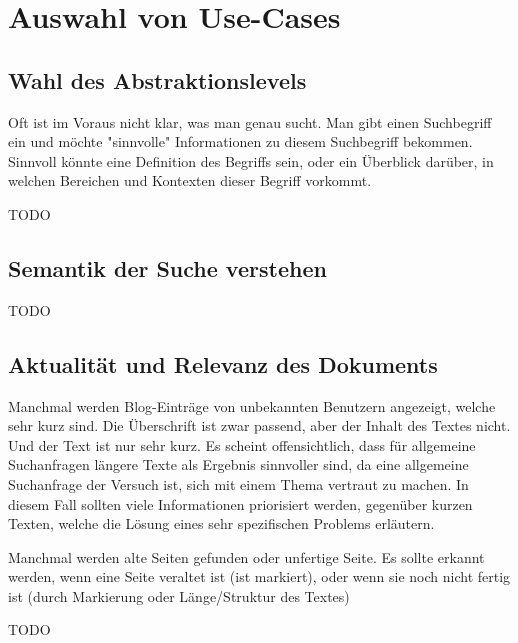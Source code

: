 \chapter{Auswahl von Use-Cases}

\section{Wahl des Abstraktionslevels}
Oft ist im Voraus nicht klar, was man genau sucht. Man gibt einen Suchbegriff ein und möchte "sinnvolle" Informationen zu diesem Suchbegriff bekommen. Sinnvoll könnte eine Definition des Begriffs sein, oder ein Überblick darüber, in welchen Bereichen und Kontexten dieser Begriff vorkommt.

TODO

\section{Semantik der Suche verstehen}
TODO

\section{Aktualität und Relevanz des Dokuments}
Manchmal werden Blog-Einträge von unbekannten Benutzern angezeigt, welche sehr kurz sind. Die Überschrift ist zwar passend, aber der Inhalt des Textes nicht. Und der Text ist nur sehr kurz. Es scheint offensichtlich, dass für allgemeine Suchanfragen längere Texte als Ergebnis sinnvoller sind, da eine allgemeine Suchanfrage der Versuch ist, sich mit einem Thema vertraut zu machen. In diesem Fall sollten viele Informationen priorisiert werden, gegenüber kurzen Texten, welche die Lösung eines sehr spezifischen Problems erläutern.

Manchmal werden alte Seiten gefunden oder unfertige Seite. Es sollte erkannt werden, wenn eine Seite veraltet ist (ist markiert), oder wenn sie noch nicht fertig ist (durch Markierung oder Länge/Struktur des Textes)

TODO
